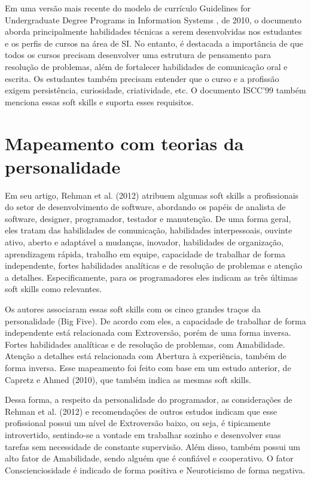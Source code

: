 Em uma versão mais recente do modelo de currículo Guidelines for Undergraduate Degree Programs in Information Systems \cite{is10}, de 2010, o documento aborda principalmente habilidades técnicas a serem desenvolvidas nos estudantes e os perfis de cursos na área de SI. No entanto, é destacada a importância de que todos os cursos precisam desenvolver uma estrutura de pensamento para resolução de problemas, além de fortalecer habilidades de comunicação oral e escrita. Os estudantes também precisam entender que o curso e a profissão exigem persistência, curiosidade, criatividade, etc. O documento ISCC'99 também menciona essas soft skills e suporta esses requisitos.

\section{Mapeamento com teorias da personalidade}
\label{sec:mapeamento}

Em seu artigo, Rehman et al. (2012)\nocite{rehman:12} atribuem algumas soft skills a profissionais do setor de desenvolvimento de software, abordando os papéis de analista de software, designer, programador, testador e manutenção. De uma forma geral, eles tratam das habilidades de comunicação, habilidades interpessoais, ouvinte ativo, aberto e adaptável a mudanças, inovador, habilidades de organização, aprendizagem rápida, trabalho em equipe, capacidade de trabalhar de forma independente, fortes habilidades analíticas e de resolução de problemas e atenção a detalhes. Especificamente, para os programadores eles indicam as três últimas soft skills como relevantes.

Os autores associaram essas soft skills com os cinco grandes traços da personalidade (Big Five). De acordo com eles, a capacidade de trabalhar de forma independente está relacionada com Extroversão, porém de uma forma inversa. Fortes habilidades analíticas e de resolução de problemas, com Amabilidade. Atenção a detalhes está relacionada com Abertura à experiência, também de forma inversa. Esse mapeamento foi feito com base em um estudo anterior, de Capretz e Ahmed (2010)\nocite{capretz:10}, que também indica as mesmas soft skills.

Dessa forma, a respeito da personalidade do programador, as considerações de Rehman et al. (2012)\nocite{rehman:12} e recomendações de outros estudos \cite{sodiya:07, martinez:11} indicam que esse profissional possui um nível de Extroversão baixo, ou seja, é tipicamente introvertido, sentindo-se a vontade em trabalhar sozinho e desenvolver suas tarefas sem necessidade de constante supervisão. Além disso, também possui um alto fator de Amabilidade, sendo alguém que é confiável e cooperativo. O fator Conscienciosidade é indicado de forma positiva e Neuroticismo de forma negativa.

